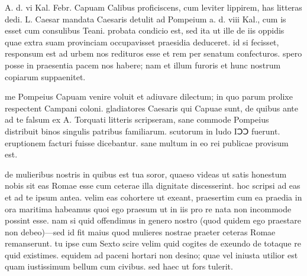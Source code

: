 


 A. d. vi Kal. Febr. Capuam Calibus proficiscens, cum leviter lippirem, has litteras dedi. L. Caesar mandata Caesaris detulit ad Pompeium a. d. viii Kal., cum is esset cum consulibus Teani. probata condicio est, sed ita ut ille de iis oppidis quae extra suam provinciam occupavisset praesidia deduceret. id si fecisset, responsum est ad urbem nos redituros esse et rem per senatum confecturos. spero posse in praesentia pacem nos habere; nam et illum furoris et hunc nostrum copiarum suppaenitet.

 me Pompeius Capuam venire voluit et adiuvare dilectum; in quo parum prolixe respectent Campani coloni. gladiatores Caesaris qui Capuae sunt, de quibus ante ad te falsum ex A. Torquati litteris scripseram, sane commode Pompeius distribuit binos singulis patribus familiarum. scutorum in ludo IↃↃ fuerunt. eruptionem facturi fuisse dicebantur. sane multum in eo rei publicae provisum est.

 de mulieribus nostris in quibus est tua soror, quaeso videas ut satis honestum nobis sit eas Romae esse cum ceterae illa dignitate discesserint. hoc scripsi ad eas et ad te ipsum antea. velim eas cohortere ut exeant, praesertim cum ea praedia in ora maritima habeamus quoi ego praesum ut in iis pro re nata non incommode possint esse. nam si quid offendimus in genero nostro (quod quidem ego praestare non debeo)—sed id fit maius quod mulieres nostrae praeter ceteras Romae remanserunt. tu ipse cum Sexto scire velim quid cogites de exeundo de totaque re quid existimes. equidem ad paceni hortari non desino; quae vel iniusta utilior est quam iustissimum bellum cum civibus. sed haec ut fors tulerit.
